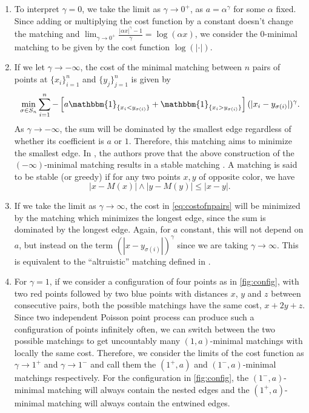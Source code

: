 \documentclass{article}
\begin{document}
  \begin{enumerate}
  \item   To interpret $\gamma =0$, we take the limit as $\gamma\rightarrow
    0^+$, as $a=\alpha^\gamma$ for some $\alpha$ fixed.
Since adding or multiplying the cost function by a constant doesn't
    change the matching and $\lim_{\gamma\rightarrow 0^+}\frac{|\alpha
    x|^\gamma
  -1}{\gamma} = \log( \alpha x)$,  we consider the
$0$-minimal matching to be given by the cost function $\log(|\cdot|)$.

\item
  If we let $\gamma\rightarrow-\infty$, the cost of the
  minimal matching between $n$ pairs of points at $\{x_i\}_{i=1}^n$
  and $\{y_j\}_{j=1}^n$ is given by
\begin{equation}\label{eq:costofnpairs}
\min_{\sigma\in S_n} \sum_{i=1}^n - \left[
  a\mathbbm{1}_{\{x_i<y_{\sigma(i)}\}} +
  \mathbbm{1}_{\{x_i>y_{\sigma(i)}\}} \right]
(|x_i-y_{\sigma(i)}|)^\gamma .\end{equation}
As $\gamma\rightarrow -\infty$, the sum will be dominated by the
smallest edge regardless of whether its coefficient is $a$ or $1$.
Therefore, this matching aims to minimize the smallest edge.
  In   \cite[Lemma 8]{minimal}, the authors prove that the above construction
  of the
  $(-\infty)$-minimal matching results in a stable matching \cite{galeshapley}.
  A matching is said to be stable (or greedy) if for any two points $x,y$ of opposite color,
  we have \[|x-M(x)|\wedge|y-M(y)|\leq |x-y|.\]


\item If we take the limit as $\gamma\rightarrow\infty$, the cost in
 \eqref{eq:costofnpairs} will be minimized by the
 matching which minimizes the longest edge, since the sum is
 dominated by the longest edge. Again, for $a$ constant, this will
 not depend on $a$, but instead on the term
 $(|x-y_{\sigma(i)}|)^\gamma$ since we are taking
 $\gamma\rightarrow\infty$.
This is equivalent to the ``altruistic'' matching defined in
 \cite{minimal}.


 \item For $\gamma=1$, if we consider a configuration of four
 points as in \cref{fig:config}, with two red points followed by two
 blue points with distances $x$, $y$ and $z$ between consecutive
 pairs,  both the possible matchings
 have the same cost, $x+2y+z$. Since two independent Poisson point process can
 produce such a configuration of points infinitely often, we can
 switch between the two possible matchings to get uncountably many
 $(1,a)$-minimal matchings with locally the same cost.
 Therefore, we consider the limits of the
 cost function  as $\gamma\rightarrow 1^+$ and $\gamma\rightarrow 1^-$
 and call them the $(1^+,a)$ and $(1^-,a)$-minimal matchings
 respectively. For the configuration in \cref{fig:config}, the
 $(1^-,a)$-minimal matching will always contain the nested edges and the
 $(1^+,a)$-minimal matching will always contain the entwined edges.



\end{enumerate}
\end{document}
